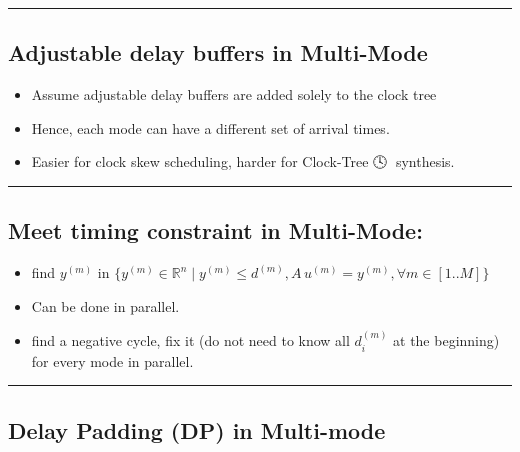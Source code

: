 \documentclass[
]{article}
\providecommand{\tightlist}{%
  \setlength{\itemsep}{0pt}\setlength{\parskip}{0pt}}
\begin{document}
\begin{center}\rule{0.5\linewidth}{0.5pt}\end{center}

\subsection{Adjustable delay buffers in Multi-Mode}\label{adjustable-delay-buffers-in-multi-mode}

\begin{itemize}
\tightlist
\item
  Assume adjustable delay buffers are added solely to the clock tree
\item
  Hence, each mode can have a different set of arrival times.
\item
  Easier for clock skew scheduling, harder for Clock-Tree 🕓🌳 synthesis.
\end{itemize}

\begin{center}\rule{0.5\linewidth}{0.5pt}\end{center}

\subsection{Meet timing constraint in Multi-Mode:}\label{meet-timing-constraint-in-multi-mode}

\begin{itemize}
\tightlist
\item
  find \(y^{(m)}\) in
  \(\{y^{(m)} \in \mathbb{R}^n \mid y^{(m)} \leq d^{(m)}, A\,u^{(m)} = y^{(m)}, \forall m\in[1..M]\}\)
\item
  Can be done in parallel.
\item
  find a negative cycle, fix it (do not need to know all \(d_i^{(m)}\)
  at the beginning) for every mode in parallel.
\end{itemize}

\begin{center}\rule{0.5\linewidth}{0.5pt}\end{center}

\subsection{Delay Padding (DP) in Multi-mode}\label{delay-padding-dp-in-multi-mode}
\end{document}
